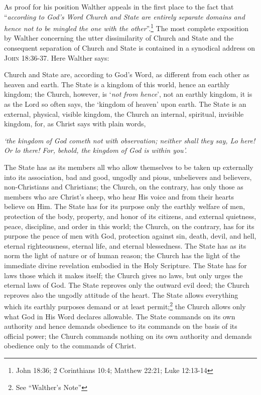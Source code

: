                As proof for his position Walther appeals in the first place to the fact that “\textit{according to God’s Word Church and State are entirely separate domains and hence not to be mingled the one with the other}”.\footnote{John 18:36; 2 Corinthians 10:4; Matthew 22:21; Luke 12:13-14}  The most complete exposition by Walther concerning the utter dissimilarity of Church and State and the consequent separation of Church and State is contained in a synodical address on {\scriptsize\textsc{John 18:36-37}}.  Here Walther says: \begin{fancyquotes}Church and State are, according to God’s Word, as different from each other as heaven and earth.  The State is a kingdom of this world, hence an earthly kingdom; the Church, however, is ‘\textit{not from hence}’, not an earthly kingdom, it is as the Lord so often says, the ‘kingdom of heaven’ upon earth.  The State is an external, physical, visible kingdom, the Church an internal, spiritual, invisible kingdom, for, as Christ says with plain words, \begin{displayquote}\textit{‘the kingdom of God cometh not with observation; neither shall they say, Lo here! Or lo there! For, behold, the kingdom of God is within you’.}\end{displayquote}  The State has as its members all who allow themselves to be taken up externally into its association, bad and good, ungodly and pious, unbelievers and believers, non-Christians and Christians; the Church, on the contrary, has only those as members who are Christ’s sheep, who hear His voice and from their hearts believe on Him.  The State has for its purpose only the earthly welfare of men, protection of the body, property, and honor of its citizens, and external quietness, peace, discipline, and order in this world; the Church, on the contrary, has for its purpose the peace of men with God, protection against sin, death, devil, and hell, eternal righteousness, eternal life, and eternal blessedness.  The State has as its norm the light of nature or of human reason; the Church has the light of the immediate divine revelation embodied in the Holy Scripture.  The State has for laws those which it makes itself; the Church gives no laws, but only urges the eternal laws of God.  The State reproves only the outward evil deed; the Church reproves also the ungodly attitude of the heart.  The State allows everything which its earthly purposes demand or at least permit;\footnote{See ``Walther's Note''} the Church allows only what God in His Word declares allowable.  The State commands on its own authority and hence demands obedience to its commands on the basis of its official power; the Church commands nothing on its own authority and demands obedience only to the commands of Christ.


\end{fancyquotes}
